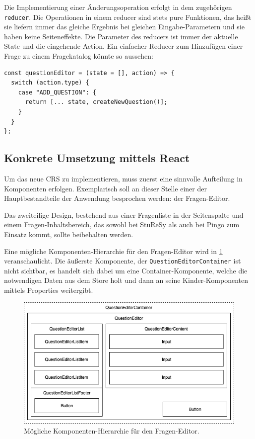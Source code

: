 Die Implementierung einer Änderungsoperation erfolgt in dem zugehörigen \texttt{reducer}. Die Operationen in einem reducer sind stets pure Funktionen, das heißt sie liefern immer das gleiche Ergebnis bei gleichen Eingabe-Parametern und sie haben keine Seiteneffekte. Die Parameter des reducers ist immer der aktuelle State und die eingehende Action. Ein einfacher Reducer zum Hinzufügen einer Frage zu einem Fragekatalog könnte so aussehen:

\begin{lstlisting}
const questionEditor = (state = [], action) => {
  switch (action.type) {
    case "ADD_QUESTION": {
      return [... state, createNewQuestion()];
    }
  }
};
\end{lstlisting}

\subsection{Konkrete Umsetzung mittels React}
Um das neue CRS zu implementieren, muss zuerst eine sinnvolle Aufteilung in Komponenten erfolgen. Exemplarisch soll an dieser Stelle einer der Hauptbestandteile der Anwendung besprochen werden: der Fragen-Editor.

Das zweiteilige Design, bestehend aus einer Fragenliste in der Seitenspalte und einem Fragen-Inhaltsbereich, das sowohl bei StuReSy als auch bei Pingo zum Einsatz kommt, sollte beibehalten werden.

Eine mögliche Komponenten-Hierarchie für den Fragen-Editor wird in \ref{Abbildung 4.1} veranschaulicht. Die äußerste Komponente, der \texttt{QuestionEditorContainer} ist nicht sichtbar, es handelt sich dabei um eine Container-Komponente, welche die notwendigen Daten aus dem Store holt und dann an seine Kinder-Komponenten mittels Properties weitergibt.

\begin{figure}[H]
    \includegraphics[width=12cm]{chapter/entwurf/Component_Hierarchy.png}
    \centering
    \caption{Mögliche Komponenten-Hierarchie für den Fragen-Editor.}
    \label{Abbildung 4.1}
\end{figure}

